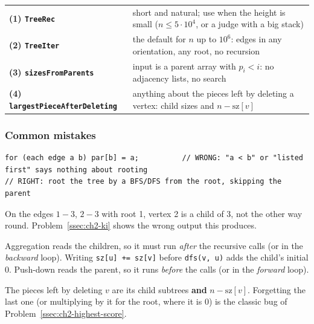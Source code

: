 \begin{insightbox}
\renewcommand{\arraystretch}{1.25}
\begin{tabularx}{\linewidth}{@{}>{\bfseries}l X@{}}
(1) \texttt{TreeRec} & short and natural; use when the height is small ($n \le 5\cdot10^4$, or a judge with a big stack) \\
(2) \texttt{TreeIter} & the default for $n$ up to $10^6$: edges in any orientation, any root, no recursion \\
(3) \texttt{sizesFromParents} & input is a parent array with $p_i < i$: no adjacency lists, no search \\
(4) \texttt{largestPieceAfterDeleting} & anything about the pieces left by deleting a vertex: child sizes and $n - \mathrm{sz}[v]$ \\
\end{tabularx}
\end{insightbox}

\subsubsection*{Common mistakes}

\begin{warningbox}
\begin{lstlisting}[style=snippet]
for (each edge a b) par[b] = a;          // WRONG: "a < b" or "listed first" says nothing about rooting
// RIGHT: root the tree by a BFS/DFS from the root, skipping the parent
\end{lstlisting}
On the edges $1{-}3$, $2{-}3$ with root 1, vertex 2 is a child of 3, not the other way round. Problem~\ref{ssec:ch2-ki} shows the wrong output this produces.
\end{warningbox}

\begin{warningbox}
Aggregation reads the children, so it must run \emph{after} the recursive calls (or in the \emph{backward} loop). Writing \texttt{sz[u] += sz[v]} before \texttt{dfs(v, u)} adds the child's initial 0. Push-down reads the parent, so it runs \emph{before} the calls (or in the \emph{forward} loop).
\end{warningbox}

\begin{warningbox}
The pieces left by deleting $v$ are its child subtrees \textbf{and} $n - \mathrm{sz}[v]$. Forgetting the last one (or multiplying by it for the root, where it is $0$) is the classic bug of Problem~\ref{ssec:ch2-highest-score}.
\end{warningbox}


